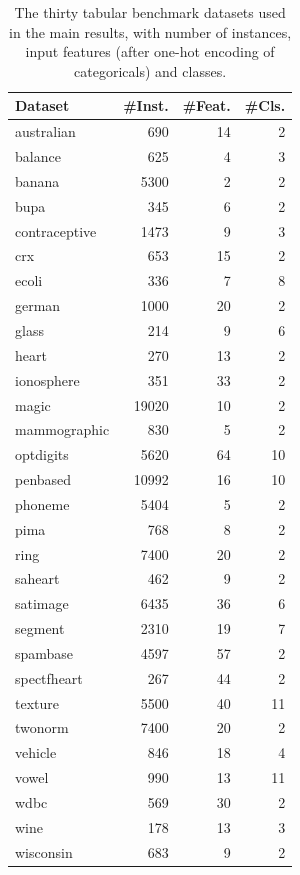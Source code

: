 \begin{table}[t]
\centering
\small
\caption{The thirty tabular benchmark datasets used in the main results, with number of instances, input features (after one-hot encoding of categoricals) and classes.}
\label{tab:datasets}
\begin{tabular}{@{}lrrr@{}}
\toprule
Dataset & \#Inst. & \#Feat. & \#Cls.\\
\midrule
australian & 690 & 14 & 2\\
balance & 625 & 4 & 3\\
banana & 5300 & 2 & 2\\
bupa & 345 & 6 & 2\\
contraceptive & 1473 & 9 & 3\\
crx & 653 & 15 & 2\\
ecoli & 336 & 7 & 8\\
german & 1000 & 20 & 2\\
glass & 214 & 9 & 6\\
heart & 270 & 13 & 2\\
ionosphere & 351 & 33 & 2\\
magic & 19020 & 10 & 2\\
mammographic & 830 & 5 & 2\\
optdigits & 5620 & 64 & 10\\
penbased & 10992 & 16 & 10\\
phoneme & 5404 & 5 & 2\\
pima & 768 & 8 & 2\\
ring & 7400 & 20 & 2\\
saheart & 462 & 9 & 2\\
satimage & 6435 & 36 & 6\\
segment & 2310 & 19 & 7\\
spambase & 4597 & 57 & 2\\
spectfheart & 267 & 44 & 2\\
texture & 5500 & 40 & 11\\
twonorm & 7400 & 20 & 2\\
vehicle & 846 & 18 & 4\\
vowel & 990 & 13 & 11\\
wdbc & 569 & 30 & 2\\
wine & 178 & 13 & 3\\
wisconsin & 683 & 9 & 2\\
\bottomrule
\end{tabular}
\end{table}
